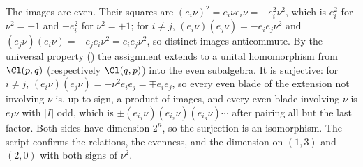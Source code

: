 The images are even. Their squares are $(e_i\nu)^2 = e_i\nu e_i\nu = -e_i^2\nu^2$, which is $e_i^2$ for $\nu^2 = -1$ and $-e_i^2$ for $\nu^2 = +1$; for $i \neq j$, $(e_i\nu)(e_j\nu) = -e_ie_j\nu^2$ and $(e_j\nu)(e_i\nu) = -e_je_i\nu^2 = e_ie_j\nu^2$, so distinct images anticommute. By the universal property () the assignment extends to a unital homomorphism from $\Cl(p,q)$ (respectively $\Cl(q,p)$) into the even subalgebra. It is surjective: for $i \neq j$, $(e_i\nu)(e_j\nu) = -\nu^2 e_ie_j = \mp e_ie_j$, so every even blade of the extension not involving $\nu$ is, up to sign, a product of images, and every even blade involving $\nu$ is $e_I\nu$ with $|I|$ odd, which is $\pm(e_{i_1}\nu)(e_{i_2}\nu)(e_{i_3}\nu)\cdots$ after pairing all but the last factor. Both sides have dimension $2^n$, so the surjection is an isomorphism. The script confirms the relations, the evenness, and the dimension on $(1,3)$ and $(2,0)$ with both signs of $\nu^2$.
